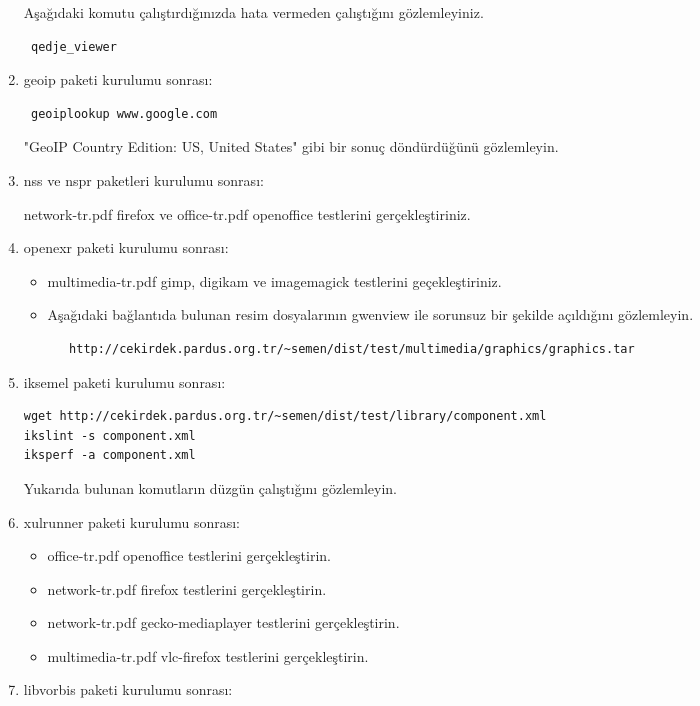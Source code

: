 \documentclass[a4paper,10pt]{article}
\begin{document}
\begin{enumerate}
Aşağıdaki komutu çalıştırdığınızda hata vermeden çalıştığını gözlemleyiniz.
\begin{verbatim}
 qedje_viewer
\end{verbatim}

\item geoip paketi kurulumu sonrası:
\begin{verbatim}
 geoiplookup www.google.com 
\end{verbatim}
"GeoIP Country Edition: US, United States" gibi bir sonuç döndürdüğünü gözlemleyin.

\item nss ve nspr paketleri kurulumu sonrası:

network-tr.pdf firefox ve office-tr.pdf openoffice testlerini gerçekleştiriniz.

\item openexr paketi kurulumu sonrası:
\begin{itemize}
 \item multimedia-tr.pdf gimp, digikam ve imagemagick testlerini geçekleştiriniz.
 \item Aşağıdaki bağlantıda bulunan resim dosyalarının gwenview ile sorunsuz bir şekilde açıldığını gözlemleyin.
  \begin{verbatim}
   http://cekirdek.pardus.org.tr/~semen/dist/test/multimedia/graphics/graphics.tar
  \end{verbatim}
\end{itemize}
\item iksemel paketi kurulumu sonrası:
\begin{verbatim}
wget http://cekirdek.pardus.org.tr/~semen/dist/test/library/component.xml
ikslint -s component.xml
iksperf -a component.xml 
\end{verbatim}

Yukarıda bulunan komutların düzgün çalıştığını gözlemleyin.

\item xulrunner paketi kurulumu sonrası:
\begin{itemize}
\item office-tr.pdf openoffice testlerini gerçekleştirin.
\item network-tr.pdf firefox testlerini gerçekleştirin.
\item network-tr.pdf gecko-mediaplayer testlerini gerçekleştirin.
\item multimedia-tr.pdf vlc-firefox testlerini gerçekleştirin.
\end{itemize}

\item libvorbis paketi kurulumu sonrası:


\end{enumerate}
\end{document}
